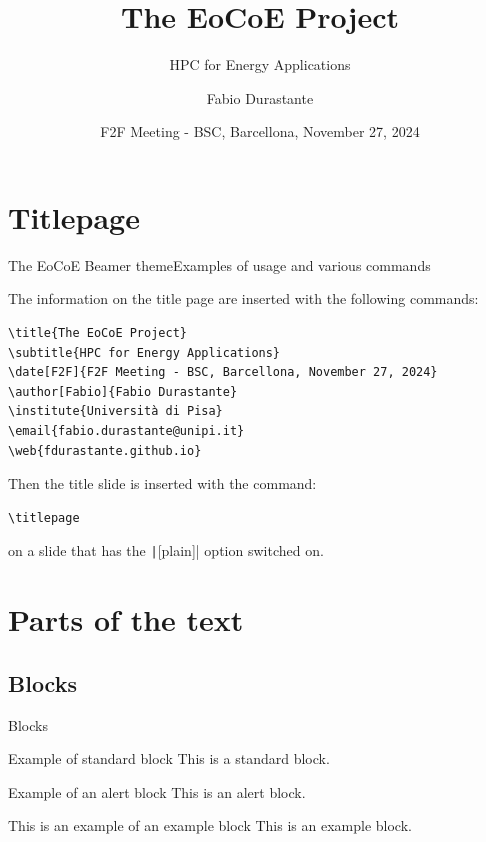 \documentclass{beamer}
\title{The EoCoE Project}
\subtitle{HPC for Energy Applications}
\date[F2F]{F2F Meeting - BSC, Barcellona, November 27, 2024}
\author[Fabio]{Fabio Durastante}
\institute{Università di Pisa}
\begin{document}
	
	\begin{frame}[plain]
		\titlepage
	\end{frame}
	
	\section{Titlepage}
	
	\begin{frame}[fragile]{The EoCoE Beamer theme}{Examples of usage and various commands}
	
	The information on the title page are inserted with the following commands:
\begin{verbatim}
\title{The EoCoE Project}
\subtitle{HPC for Energy Applications}
\date[F2F]{F2F Meeting - BSC, Barcellona, November 27, 2024}
\author[Fabio]{Fabio Durastante}
\institute{Università di Pisa}
\email{fabio.durastante@unipi.it}
\web{fdurastante.github.io}
\end{verbatim}

	Then the title slide is inserted with the command:
\begin{verbatim}
\titlepage
\end{verbatim}
	on a slide that has the \texttt|[plain]| option switched on.
	\end{frame}
	
	\section{Parts of the text}
	
	\subsection{Blocks}
	
	\begin{frame}{Blocks}
	
	\begin{block}{Example of standard block}
	This is a standard block.
	\end{block}
	
	\begin{alertblock}{Example of an alert block}
	This is an \alert{alert block}.
	\end{alertblock}
	
	\begin{exampleblock}{This is an example of an example block}
	This is an example block.
	\end{exampleblock}
	
	\end{frame}
	
\end{document}
